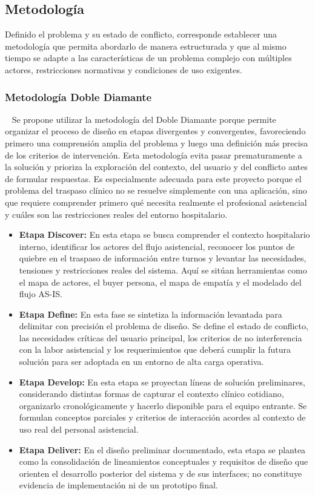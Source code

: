 \subsection{Metodología}
Definido el problema y su estado de conflicto, corresponde establecer una metodología que permita abordarlo de manera estructurada y que al mismo tiempo se adapte a las características de un problema complejo con múltiples actores, restricciones normativas y condiciones de uso exigentes.\\
\subsubsection*{Metodología Doble Diamante} ~
Se propone utilizar la metodología del Doble Diamante \cite{ref_design_council_double_diamond} porque permite organizar el proceso de diseño en etapas divergentes y convergentes, favoreciendo primero una comprensión amplia del problema y luego una definición más precisa de los criterios de intervención. Esta metodología evita pasar prematuramente a la solución y prioriza la exploración del contexto, del usuario y del conflicto antes de formular respuestas. Es especialmente adecuada para este proyecto porque el problema del traspaso clínico no se resuelve simplemente con una aplicación, sino que requiere comprender primero qué necesita realmente el profesional asistencial y cuáles son las restricciones reales del entorno hospitalario.\\
\begin{itemize}
    \item \textbf{Etapa Discover:} En esta etapa se busca comprender el contexto hospitalario interno, identificar los actores del flujo asistencial, reconocer los puntos de quiebre en el traspaso de información entre turnos y levantar las necesidades, tensiones y restricciones reales del sistema. Aquí se sitúan herramientas como el mapa de actores, el buyer persona, el mapa de empatía y el modelado del flujo AS-IS.
    \item \textbf{Etapa Define:} En esta fase se sintetiza la información levantada para delimitar con precisión el problema de diseño. Se define el estado de conflicto, las necesidades críticas del usuario principal, los criterios de no interferencia con la labor asistencial y los requerimientos que deberá cumplir la futura solución para ser adoptada en un entorno de alta carga operativa.
    \item \textbf{Etapa Develop:} En esta etapa se proyectan líneas de solución preliminares, considerando distintas formas de capturar el contexto clínico cotidiano, organizarlo cronológicamente y hacerlo disponible para el equipo entrante. Se formulan conceptos parciales y criterios de interacción acordes al contexto de uso real del personal asistencial.
    \item \textbf{Etapa Deliver:} En el diseño preliminar documentado, esta etapa se plantea como la consolidación de lineamientos conceptuales y requisitos de diseño que orienten el desarrollo posterior del sistema y de sus interfaces; no constituye evidencia de implementación ni de un prototipo final.
\end{itemize}
